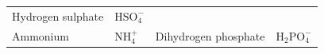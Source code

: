 {\begin{tabular}[t]{|l|l|l|l|}
    
        Hydrogen sulphate &
    
    
        \begin{math}\mathrm{HSO}_{4}^{-}\end{math}%
     \tabularnewline\cline{1-1}\cline{2-2}\cline{3-3}\cline{4-4}
    
    
        Ammonium &
    
    
        \begin{math}\mathrm{NH}_{4}^{+}\end{math} &
    
    
        Dihydrogen phosphate &
    
    
        \begin{math}{\mathrm{H}}_{2}\mathrm{PO}_{4}^{-}\end{math}%
     \tabularnewline\cline{1-1}\cline{2-2}\cline{3-3}\cline{4-4}
    
    

\end{tabular}}
